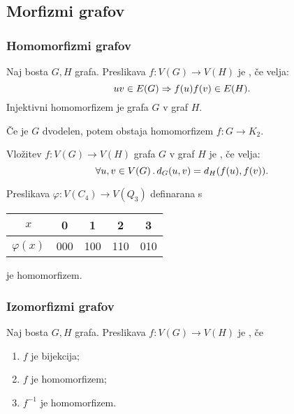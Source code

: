 \subsection{Morfizmi grafov}
\subsubsection*{Homomorfizmi grafov}
\begin{definicija}
    Naj bosta $G, H$ grafa. Preslikava $f: V(G) \to V(H)$ je , če velja: $$uv \in E(G) \Rightarrow f(u)f(v) \in E(H).$$
    Injektivni homomorfizem je  grafa $G$ v graf $H$.
\end{definicija}

\begin{opomba}
    Če je $G$ dvodelen, potem obstaja homomorfizem $f: G \to K_2$.
\end{opomba}

\begin{definicija}
    Vložitev $f: V(G) \to V(H)$ grafa $G$ v graf $H$ je , če velja:
    $$\forall u, v \in V(G) \,.\,d_G(u,v)=d_H(f(u), f(v)).$$
\end{definicija}

\begin{primer}
    Preslikava $\varphi: V(C_4) \to V(Q_3)$ definarana s 
    \begin{center}
        \begin{tabular}{ c | c c c c }
         $x$ & 0 & 1 & 2 & 3 \\ \hline
         $\varphi(x)$ & 000 & 100 & 110 & 010  
        \end{tabular}
    \end{center}
    je homomorfizem.
\end{primer}

\subsubsection*{Izomorfizmi grafov}
\begin{definicija}
    Naj bosta $G, H$ grafa. Preslikava $f: V(G) \to V(H)$ je , če
    \begin{enumerate}
        \item $f$ je bijekcija;
        \item $f$ je homomorfizem;
        \item $f^{-1}$ je homomorfizem.
    \end{enumerate}
\end{definicija}

